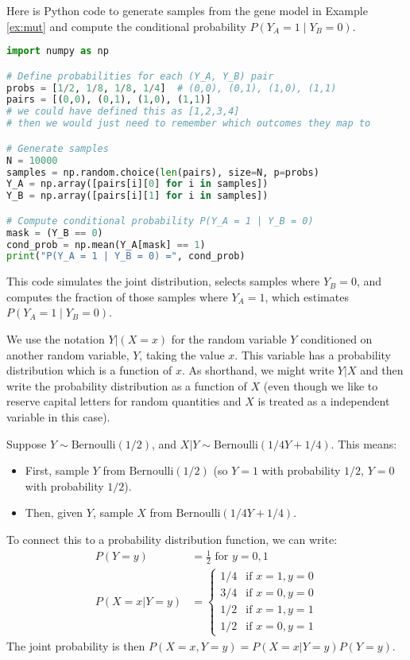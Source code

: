 \begin{example}
Here is Python code to generate samples from the gene model in Example \ref{ex:mut} and compute the conditional probability $P(Y_A = 1 \mid Y_B = 0)$.

\begin{lstlisting}[language=Python]
import numpy as np

# Define probabilities for each (Y_A, Y_B) pair
probs = [1/2, 1/8, 1/8, 1/4]  # (0,0), (0,1), (1,0), (1,1)
pairs = [(0,0), (0,1), (1,0), (1,1)]
# we could have defined this as [1,2,3,4] 
# then we would just need to remember which outcomes they map to

# Generate samples
N = 10000
samples = np.random.choice(len(pairs), size=N, p=probs)
Y_A = np.array([pairs[i][0] for i in samples])
Y_B = np.array([pairs[i][1] for i in samples])

# Compute conditional probability P(Y_A = 1 | Y_B = 0)
mask = (Y_B == 0)
cond_prob = np.mean(Y_A[mask] == 1)
print("P(Y_A = 1 | Y_B = 0) =", cond_prob)
\end{lstlisting}

This code simulates the joint distribution, selects samples where $Y_B = 0$, and computes the fraction of those samples where $Y_A = 1$, which estimates $P(Y_A = 1 \mid Y_B = 0)$.
\end{example}




We use the notation $Y|(X=x)$ for the random variable $Y$ conditioned on another random variable, $Y$, taking the value $x$. This variable has a probability distribution which is a function of $x$. As shorthand, we might write $Y|X$ and then write the probability distribution as a function of $X$ (even though we like to reserve capital letters for random quantities and $X$ is treated as a independent variable in this case). 

\begin{example}
Suppose $Y \sim \text{Bernoulli}(1/2)$, and $X|Y \sim \text{Bernoulli}(1/4Y + 1/4)$. This means:
\begin{itemize}
  \item First, sample $Y$ from $\text{Bernoulli}(1/2)$ (so $Y=1$ with probability $1/2$, $Y=0$ with probability $1/2$).
  \item Then, given $Y$, sample $X$ from $\text{Bernoulli}(1/4Y + 1/4)$.
\end{itemize}
To connect this to a probability distribution function, we can write:
\begin{align*}
P(Y=y) &= \frac{1}{2} \text{ for } y=0,1 \\
P(X=x|Y=y) &= \begin{cases}
  1/4 & \text{if } x=1, y=0 \\
  3/4 & \text{if } x=0, y=0 \\
  1/2 & \text{if } x=1, y=1 \\
  1/2 & \text{if } x=0, y=1
\end{cases}
\end{align*}
The joint probability is then $P(X=x, Y=y) = P(X=x|Y=y)P(Y=y)$.
\end{example}

